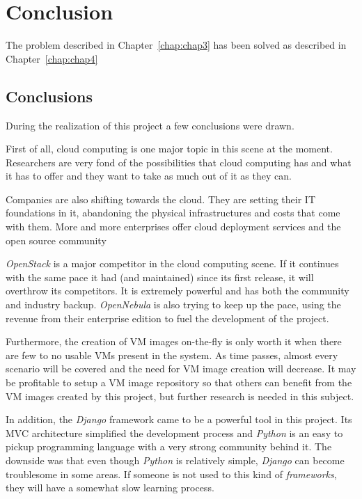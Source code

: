 \chapter{Conclusion} \label{chap:concl}

The problem described in Chapter~\ref{chap:chap3} has been solved as described in Chapter~\ref{chap:chap4}

\section{Conclusions}\label{sec:conclusions}

During the realization of this project a few conclusions were drawn.

First of all, cloud computing is one major topic in this scene at the moment. Researchers are very fond of the possibilities that cloud computing has and what it has to offer and they want to take as much out of it as they can. 

Companies are also shifting towards the cloud. They are setting their IT foundations in it, abandoning the physical infrastructures and costs that come with them. More and more enterprises offer cloud deployment services and the open source community 

\textit{OpenStack} is a major competitor in the cloud computing scene. If it continues with the same pace it had (and maintained) since its first release, it will overthrow its competitors. It is extremely powerful and has both the community and industry backup. \textit{OpenNebula} is also trying to keep up the pace, using the revenue from their enterprise edition to fuel the development of the project.

Furthermore, the creation of VM images on-the-fly is only worth it when there are few to no usable VMs present in the system. As time passes, almost every scenario will be covered and the need for VM image creation will decrease. It may be profitable to setup a VM image repository so that others can benefit from the VM images created by this project, but further research is needed in this subject.

In addition, the \textit{Django} framework came to be a powerful tool in this project. Its MVC architecture simplified the development process and \textit{Python} is an easy to pickup programming language with a very strong community behind it. The downside was that even though \textit{Python} is relatively simple, \textit{Django} can become troublesome in some areas. If someone is not used to this kind of \textit{frameworks}, they will have a somewhat slow learning process. 


